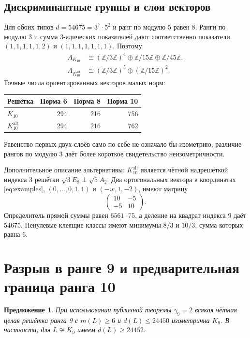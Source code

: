 \documentclass[11pt,a4paper]{article}
\newtheorem{proposition}[theorem]{Предложение}
\theoremstyle{remark}\newtheorem{remark}[theorem]{Замечание}
\newcommand{\Z}{\mathbb Z}\newcommand{\R}{\mathbb R}\newcommand{\F}{\mathbb F}
\newcommand{\Kalt}{K_{10}^{\mathrm{alt}}}
\begin{document}
\subsection{Дискриминантные группы и слои векторов}

Для обоих типов $d=54675=3^7\cdot5^2$ и ранг по модулю 5 равен 8. Ранги по модулю 3 и сумма $3$-адических показателей дают соответственно показатели $(1,1,1,1,1,2)$ и $(1,1,1,1,1,1,1)$. Поэтому
\begin{align*}
A_{K_{10}}&\cong(\Z/3\Z)^4\oplus\Z/15\Z\oplus\Z/45\Z,\\
A_{\Kalt}&\cong(\Z/3\Z)^5\oplus(\Z/15\Z)^2.
\end{align*}
Точные числа ориентированных векторов малых норм:
\begin{center}
\begin{tabular}{lrrr}
\toprule
Решётка &Норма 6&Норма 8&Норма 10\\\midrule
$K_{10}$&294&216&756\\
$\Kalt$&294&216&762\\
\bottomrule
\end{tabular}
\end{center}
Равенство первых двух слоёв само по себе не означало бы изометрию; различие рангов по модулю 3 даёт более короткое свидетельство неизометричности.

Дополнительное описание альтернативы: $\Kalt$ является чётной надрешёткой индекса 3 решётки $\sqrt3E_8\perp\sqrt5A_2$. Два ортогональных вектора в координатах \eqref{eq:examples}, $(0,\ldots,0,1,1)$ и $(-w,1,-2)$, имеют матрицу
\[
\begin{pmatrix}10&-5\\-5&10\end{pmatrix}.
\]
Определитель прямой суммы равен $6561\cdot75$, а деление на квадрат индекса $9$ даёт 54675. Ненулевые клеящие классы имеют минимумы $8/3$ и $10/3$, сумма которых равна 6.

\section{Разрыв в ранге 9 и предварительная граница ранга 10}

\begin{proposition}\label{prop:gap}
При использовании публичной теоремы $\gamma_9=2$ всякая чётная целая решётка ранга 9 с $m(L)\ge6$ и $d(L)\le24450$ изометрична $K_9$. В частности, для $L\not\cong K_9$ имеем $d(L)\ge24452$.
\end{proposition}
\end{document}
